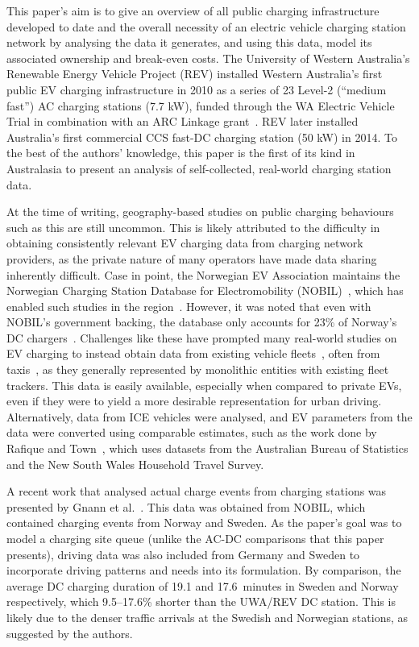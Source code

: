 This paper's aim is to give an overview of all public charging infrastructure developed to date and the overall necessity of an electric vehicle charging station network by analysing the data it generates, and using this data, model its associated ownership and break-even costs. The University of Western Australia's Renewable Energy Vehicle Project (REV) installed Western Australia's first public EV charging infrastructure in 2010 as a series of 23 Level-2 (``medium fast'') AC charging stations (7.7 kW), funded through the WA Electric Vehicle Trial in combination with an ARC Linkage grant~\cite{mader_western_2013}. REV later installed Australia's first commercial CCS fast-DC charging station (50 kW) in 2014. To the best of the authors' knowledge, this paper is the first of its kind in Australasia to present an analysis of self-collected, real-world charging station data.

At the time of writing, geography-based studies on public charging behaviours such as this are still uncommon. This is likely attributed to the difficulty in obtaining consistently relevant EV charging data from charging network providers, as the private nature of many operators have made data sharing inherently difficult. Case in point, the Norwegian EV Association maintains the Norwegian Charging Station Database for Electromobility (NOBIL)~\cite{kvisle_norwegian_2012}, which has enabled such studies in the region~\cite{harbo_agent_2018, gnann_fast_2018}. However, it was noted that even with NOBIL's government backing, the database only accounts for 23\% of Norway's DC chargers~\cite{gnann_fast_2018}. Challenges like these have prompted many real-world studies on EV charging to instead obtain data from existing vehicle fleets~\cite{yang_investigation_2018}, often from taxis~\cite{rao_modeling_2018, zhiyong_tian_understanding_2014}, as they generally represented by monolithic entities with existing fleet trackers. This data is easily available, especially when compared to private EVs, even if they were to yield a more desirable representation for urban driving. Alternatively, data from ICE vehicles were analysed, and EV parameters from the data were converted using comparable estimates, such as the work done by Rafique and Town~\cite{rafique_potential_2019}, which uses datasets from the Australian Bureau of Statistics and the New South Wales Household Travel Survey. 


A recent work that analysed actual charge events from charging stations was presented by Gnann et al.~\cite{gnann_fast_2018}. This data was obtained from NOBIL, which contained charging events from Norway and Sweden. As the paper's goal was to model a charging site queue (unlike the AC-DC comparisons that this paper presents), driving data was also included from Germany and Sweden to incorporate driving patterns and needs into its formulation. By comparison, the average DC charging duration of 19.1 and 17.6~minutes in Sweden and Norway respectively, which 9.5--17.6\% shorter than the UWA/REV DC station. This is likely due to the denser traffic arrivals at the Swedish and Norwegian stations, as suggested by the authors. 

